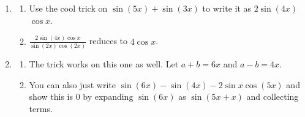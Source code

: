\documentclass[english]{book}
\begin{document}
\begin{enumerate}
\begin{enumerate}
\begin{enumerate}[\hspace{1cm}a)]
              \end{enumerate}
        \item \begin{enumerate}[\hspace{1cm}a)]
                \item Use the cool trick on $\sin(5x) + \sin(3x)$ to write it as $2 \sin(4x)$ $\cos x$.
                \item $\frac{2\sin(4x)\cos x}{\sin(2x)\cos(2x)}$ reduces to $4\cos x$.
              \end{enumerate}
        \item \begin{enumerate}[\hspace{1cm}a)]
                \item The trick works on this one as well. Let $a+b=6x$ and $a-b=4x$.
                \item You can also just write $\sin(6x) - \sin(4x) -2 \sin x  \cos(5x)$ and show this is $0$ by expanding $\sin(6x)$ as $\sin(5x+x)$ and collecting terms.

                   \vspace{0.3cm}
                

\end{enumerate}
\end{enumerate}
\end{enumerate}
\end{document}
